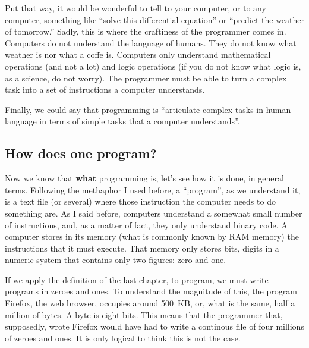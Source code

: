 \documentclass[a4paper]{article}
\begin{document}
Put that way, it would be wonderful to tell to your computer, or to any
computer, something like ``solve this differential equation'' or ``predict the
weather of tomorrow.'' Sadly, this is where the craftiness of the programmer
comes in. Computers do not understand the language of humans. They do not know
what weather is nor what a coffe is. Computers only understand mathematical
operations (and not a lot) and logic operations (if you do not know what logic
is, as a science, do not worry). The programmer must be able to turn a complex
task into a set of instructions a computer understands.


Finally, we could say that programming is ``articulate complex tasks in human
language in terms of simple tasks that a computer understands''.

\subsection{How does one program?}
Now we know that \textbf{what} programming is, let's see how it is done, in
general terms. Following the methaphor I used before, a ``program'', as we
understand it, is a text file (or several) where those instruction the computer
needs to do something are. As I said before, computers understand a somewhat
small number of instructions, and, as a matter of fact, they only understand
binary code. A computer stores in its memory (what is commonly known
by RAM memory) the instructions that it must execute. That memory only stores
bits, digits in a numeric system that contains only two figures: zero and one.

If we apply the definition of the last chapter, to program, we must write
programs in zeroes and ones. To understand the magnitude of this, the program
Firefox, the web browser, occupies around 500~KB, or, what is the same, half a
million of bytes. A byte is eight bits. This means that the programmer that,
supposedly, wrote Firefox would have had to write a continous file of four
millions of zeroes and ones. It is only logical to think this is not the case.
\end{document}
